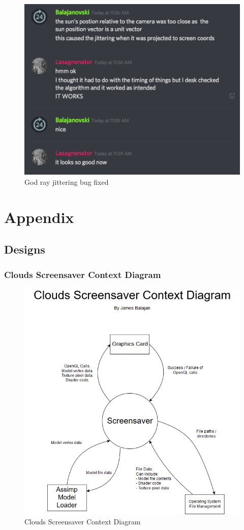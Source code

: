 \documentclass[10pt, openany]{book}
\begin{document}
\begin{figure}[H]
	\centering
	\includegraphics[width=0.5\linewidth]{testing4}
	\caption{God ray jittering bug fixed}
	\label{fig:fixed}
\end{figure}

\printbibliography[heading=bibintoc,title={Bibliography}]

\printglossaries

\chapter{Appendix}
\section{Designs}
\subsection{Clouds Screensaver Context Diagram}
\begin{figure}[H]
	\centering
	\includegraphics[width=0.9\linewidth]{Clouds Context Diagram}
	\caption{Clouds Screensaver Context Diagram}
	\label{app:clouds-context}
\end{figure}
\newpage
\end{document}

